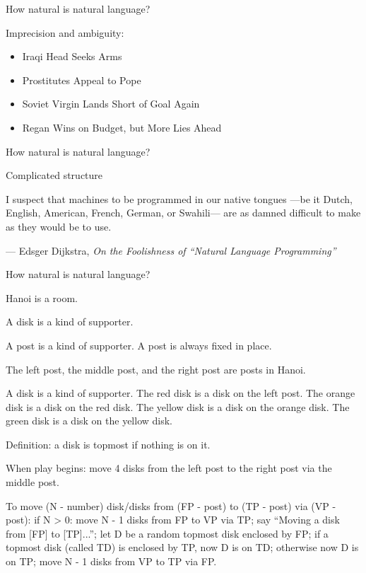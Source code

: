 \documentclass{beamer}
\newenvironment{Snippet}{\Verbatim[samepage=true,fontsize=\tiny]}{\endVerbatim}
\begin{document}
\begin{frame}{How natural is natural language?}

  Imprecision and ambiguity:
  \begin{itemize}
    \pause
  \item Iraqi Head Seeks Arms
    \pause
  \item Prostitutes Appeal to Pope
    \pause
  \item Soviet Virgin Lands Short of Goal Again
    \pause
  \item Regan Wins on Budget, but More Lies Ahead
  \end{itemize}
  
\end{frame}

\begin{frame}{How natural is natural language?}

  Complicated structure
  \pause
  \begin{displayquote}
    I suspect that machines to be programmed in our native tongues —be it Dutch,
    English, American, French, German, or Swahili— are as damned
    difficult to make as they would be to use.
  \end{displayquote}
  --- Edsger Dijkstra, \textit{On the Foolishness of ``Natural Language Programming''}
\end{frame}


\begin{frame}[fragile]{How natural is natural language?}
  
  \begin{Snippet}
    Hanoi is a room.
    
    A disk is a kind of supporter.
    
    A post is a kind of supporter. A post is always fixed in place.
    
    The left post, the middle post, and the right post are posts in Hanoi.
    
    A disk is a kind of supporter.
    The red disk is a disk on the left post.
    The orange disk is a disk on the red disk.
    The yellow disk is a disk on the orange disk.
    The green disk is a disk on the yellow disk.

    Definition: a disk is topmost if nothing is on it.

    When play begins:
        move 4 disks from the left post to the right post via the middle post.

    To move (N - number) disk/disks from (FP - post) to (TP - post) via (VP - post):
        if N > 0:
            move N - 1 disks from FP to VP via TP;
            say ``Moving a disk from [FP] to [TP]...'';
            let D be a random topmost disk enclosed by FP;
            if a topmost disk (called TD) is enclosed by TP, now D is on TD;
            otherwise now D is on TP;
            move N - 1 disks from VP to TP via FP.
  \end{Snippet}

\end{frame}
\end{document}
